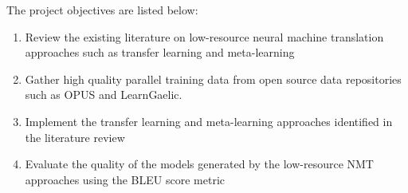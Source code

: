 The project objectives are listed below:

\begin{enumerate}
  \item Review the existing literature on low-resource neural machine translation approaches such as transfer learning and meta-learning

  \item Gather high quality parallel training data from open source data repositories such as OPUS and LearnGaelic.
  \item Implement the transfer learning and meta-learning approaches identified in the literature review
  \item Evaluate the quality of the models generated by the low-resource \acrshort{NMT} approaches using the \acrshort{BLEU} score metric
\end{enumerate}
